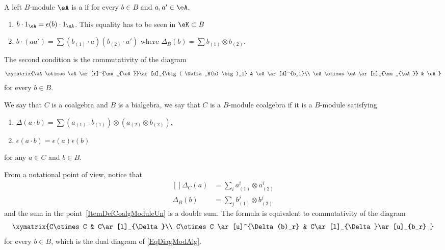 \begin{definition}		\label{DefBModuleAlgebra}
	A left $B$-module $\eA$ is a  if for every $b\in B$ and $a,a'\in\eA$,
	\begin{enumerate}

		\item
		      $b\cdot 1_{\eA}=\epsilon(b)\cdot 1_{\eA}$. This equality has to be seen in $\eK\subset B$
		\item
		      $b\cdot(aa')=\sum(b_{(1)}\cdot a)(b_{(2)}\cdot a')$ where $\Delta_B(b)=\sum b_{(1)}\otimes b_{(2)}$.

	\end{enumerate}
	The second condition is the commutativity of the diagram
	\begin{equation}	\label{EqDiagModAlg}
		\xymatrix{%
		\eA\otimes\eA \ar[r]^{\mu_{\eA}}\ar[d]_{\big( \Delta_B(b) \big)_l}	&	\eA\ar[d]^{b_l}\\
		\eA\otimes\eA \ar[r]_{\mu_{\eA}}	&	\eA
		}
	\end{equation}
	for every $b\in B$.
\end{definition}

\begin{definition}
	We say that $C$ is a coalgebra and $B$ is a bialgebra, we say that $C$ is a $B$-module coalgebra if it is a $B$-module satisfying
	\begin{enumerate}

		\item\label{ItemDefCoalgModuleUn}
		$\Delta(a\cdot b)=\sum (a_{(1)}\cdot b_{(1)})\otimes (a_{(2)}\otimes b_{(2)})$,
		\item
		      $\epsilon(a\cdot b)=\epsilon(a)\epsilon(b)$

	\end{enumerate}
	for any $a\in C$ and $b\in B$.
\end{definition}
From a notational point of view, notice that
\begin{equation}
	\begin{aligned}[]
		\Delta_C(a) & =\sum_ia_{(1)}^i\otimes a_{(2)}^i \\
		\Delta_B(b) & =\sum_jb_{(1)}^j\otimes b_{(2)}^j
	\end{aligned}
\end{equation}
and the sum in the point~\ref{ItemDefCoalgModuleUn} is a double sum. The formula is equivalent to commutativity of the diagram
\begin{equation}	\label{EqDiagModCoAlg}
	\xymatrix{%
		C\otimes C 		&	C\ar[l]_{\Delta}\\
		C\otimes C \ar[u]^{\Delta(b)_r}	&	C\ar[l]_{\Delta}\ar[u]_{b_r}
	}
\end{equation}
for every $b\in B$, which is the dual diagram of \eqref{EqDiagModAlg}.

